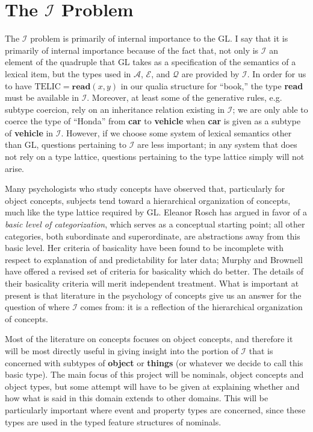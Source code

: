 \documentclass[12pt]{amsart}
\begin{document}
\section{The $\mathcal{I}$ Problem}

The $\mathcal{I}$ problem is primarily of internal importance to the GL. I say that it is primarily of internal importance because of the fact that, not only is $\mathcal{I}$ an element of the quadruple that GL takes as a specification of the semantics of a lexical item, but the types used in $\mathcal{A}$, $\mathcal{E}$, and $\mathcal{Q}$ are provided by $\mathcal{I}$. In order for us to have $\text{TELIC}=\textbf{read}(x,y)$ in our qualia structure for ``book,'' the type {\bf read} must be available in $\mathcal{I}$. Moreover, at least some of the generative rules, e.g. subtype coercion, rely on an inheritance relation existing in $\mathcal{I}$; we are only able to coerce the type of ``Honda'' from {\bf car} to {\bf vehicle} when {\bf car} is given as a subtype of {\bf vehicle} in $\mathcal{I}$. However, if we choose some system of lexical semantics other than GL, questions pertaining to $\mathcal{I}$ are less important; in any system that does not rely on a type lattice, questions pertaining to the type lattice simply will not arise.

Many psychologists who study concepts have observed that, particularly for object concepts, subjects tend toward a hierarchical organization of concepts, much like the type lattice required by GL. Eleanor Rosch \cite{Rosch78} has argued in favor of a \emph{basic level of categorization}, which serves as a conceptual starting point; all other categories, both subordinate and superordinate, are abstractions away from this basic level. Her criteria of basicality have been found to be incomplete with respect to explanation of and predictability for later data; Murphy and Brownell \cite{MurphyBrownell85} have offered a revised set of criteria for basicality which do better. The details of their basicality criteria will merit independent treatment. What is important at present is that literature in the psychology of concepts give us an answer for the question of where $\mathcal{I}$ comes from: it is a reflection of the hierarchical organization of concepts.

Most of the literature on concepts focuses on object concepts, and therefore it will be most directly useful in giving insight into the portion of $\mathcal{I}$ that is concerned with subtypes of {\bf object} or {\bf things} (or whatever we decide to call this basic type). The main focus of this project will be nominals, object concepts and object types, but some attempt will have to be given at explaining whether and how what is said in this domain extends to other domains. This will be particularly important where event and property types are concerned, since these types are used in the typed feature structures of nominals.
\end{document}
